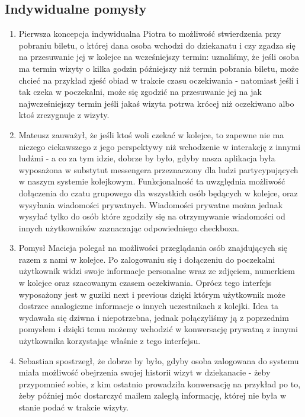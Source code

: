 \documentclass[12pt]{article}
\begin{document}
\subsection {Indywidualne pomysły}
\begin {enumerate}
	\item Pierwsza koncepcja indywidualna Piotra to możliwość stwierdzenia przy pobraniu biletu, o której dana osoba wchodzi do dziekanatu i czy zgadza się na przesuwanie jej w kolejce na wcześniejszy termin: uznaliśmy, że jeśli osoba ma termin wizyty o kilka godzin późniejszy niż termin pobrania biletu, może chcieć na przykład zjeść obiad w trakcie czasu oczekiwania - natomiast jeśli i tak czeka w poczekalni, może się zgodzić na przesuwanie jej na jak najwcześniejszy termin jeśli jakaś wizyta potrwa krócej niż oczekiwano albo ktoś zrezygnuje z wizyty.
	
	\item Mateusz zauważył, że jeśli ktoś woli czekać w kolejce, to zapewne nie ma niczego ciekawszego z jego perspektywy niż wchodzenie w interakcję z innymi ludźmi - a co za tym idzie, dobrze by było, gdyby nasza aplikacja była wyposażona w substytut messengera przeznaczony dla ludzi partycypujących w naszym systemie kolejkowym. Funkcjonalność ta uwzględnia możliwość dołączenia do czatu grupowego dla wszystkich osób będących w kolejce, oraz wysyłania wiadomości prywatnych. Wiadomości prywatne można jednak wysyłać tylko do osób które zgodziły się na otrzymywanie wiadomości od innych użytkowników zaznaczając odpowiedniego checkboxa.
	
	\item Pomysł Macieja polegał na możliwości przeglądania osób znajdujących się razem z nami w kolejce. Po zalogowaniu się i dołączeniu do poczekalni użytkownik widzi swoje informacje personalne wraz ze zdjęciem, numerkiem w kolejce oraz szacowanym czasem oczekiwania. Oprócz tego interfejs wyposażony jest w guziki next i previous dzięki którym użytkownik może dostrzec analogiczne informacje o innych uczestnikach z kolejki. Idea ta wydawała się dziwna i niepotrzebna, jednak połączyliśmy ją z poprzednim pomysłem i dzięki temu możemy wchodzić w konwersację prywatną z innymi użytkownika korzystając właśnie z tego interfejsu.	
	
	\item Sebastian spostrzegł, że dobrze by było, gdyby osoba zalogowana do systemu miała możliwość obejrzenia swojej historii wizyt w dziekanacie - żeby przypomnieć sobie, z kim ostatnio prowadziła konwersację na przykład po to, żeby później móc dostarczyć mailem zaległą informację, której nie była w stanie podać w trakcie wizyty.

\end {enumerate}
\end{document}
